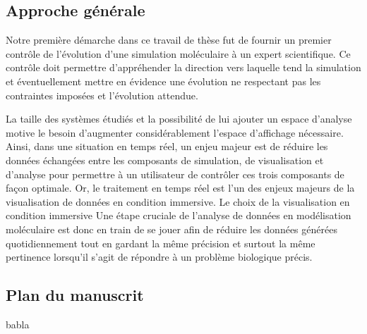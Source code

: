  
\subsection*{Approche générale}

Notre première démarche dans ce travail de thèse fut de fournir un premier contrôle de l'évolution d'une simulation moléculaire à un expert scientifique. Ce contrôle doit permettre d'appréhender la direction vers laquelle tend la simulation et éventuellement mettre en évidence une évolution ne respectant pas les contraintes imposées et l'évolution attendue. 

La taille des systèmes étudiés et la possibilité de lui ajouter un espace d'analyse motive le besoin d'augmenter considérablement l'espace d'affichage nécessaire. Ainsi, dans une situation en temps réel, un enjeu majeur est de réduire les données échangées entre les composants de simulation, de visualisation et d'analyse pour permettre à un utilisateur de contrôler ces trois composants de façon optimale. Or, le traitement en temps réel est l'un des enjeux majeurs de la visualisation de données en condition immersive. Le choix de la visualisation en condition immersive  \style Une étape cruciale de l'analyse de données en modélisation moléculaire est donc en train de se jouer afin de réduire les données générées quotidiennement tout en gardant la même précision et surtout la même pertinence lorsqu'il s'agit de répondre à un problème biologique précis.




\subsection*{Plan du manuscrit}


babla